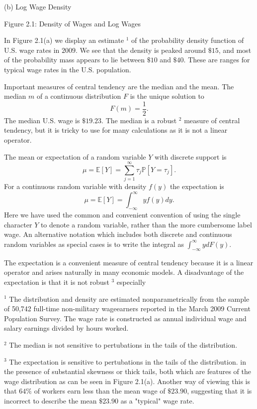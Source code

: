 \documentclass[10pt]{article}
\begin{document}
(b) Log Wage Density

Figure 2.1: Density of Wages and Log Wages

In Figure 2.1(a) we display an estimate ${ }^{1}$ of the probability density function of U.S. wage rates in $2009 .$ We see that the density is peaked around $\$ 15$, and most of the probability mass appears to lie between $\$ 10$ and $\$ 40$. These are ranges for typical wage rates in the U.S. population.

Important measures of central tendency are the median and the mean. The median $m$ of a continuous distribution $F$ is the unique solution to
$$
F(m)=\frac{1}{2} .
$$
The median U.S. wage is $\$ 19.23$. The median is a robust ${ }^{2}$ measure of central tendency, but it is tricky to use for many calculations as it is not a linear operator.

The mean or expectation of a random variable $Y$ with discrete support is
$$
\mu=\mathbb{E}[Y]=\sum_{j=1}^{\infty} \tau_{j} \mathbb{P}\left[Y=\tau_{j}\right] .
$$
For a continuous random variable with density $f(y)$ the expectation is
$$
\mu=\mathbb{E}[Y]=\int_{-\infty}^{\infty} y f(y) d y .
$$
Here we have used the common and convenient convention of using the single character $Y$ to denote a random variable, rather than the more cumbersome label wage. An alternative notation which includes both discrete and continuous random variables as special cases is to write the integral as $\int_{-\infty}^{\infty} y d F(y)$.

The expectation is a convenient measure of central tendency because it is a linear operator and arises naturally in many economic models. A disadvantage of the expectation is that it is not robust ${ }^{3}$ especially

${ }^{1}$ The distribution and density are estimated nonparametrically from the sample of 50,742 full-time non-military wageearners reported in the March 2009 Current Population Survey. The wage rate is constructed as annual individual wage and salary earnings divided by hours worked.

${ }^{2}$ The median is not sensitive to pertubations in the tails of the distribution.

${ }^{3}$ The expectation is sensitive to pertubations in the tails of the distribution. in the presence of substantial skewness or thick tails, both which are features of the wage distribution as can be seen in Figure 2.1(a). Another way of viewing this is that $64 \%$ of workers earn less than the mean wage of $\$ 23.90$, suggesting that it is incorrect to describe the mean $\$ 23.90$ as a "typical" wage rate.
\end{document}
